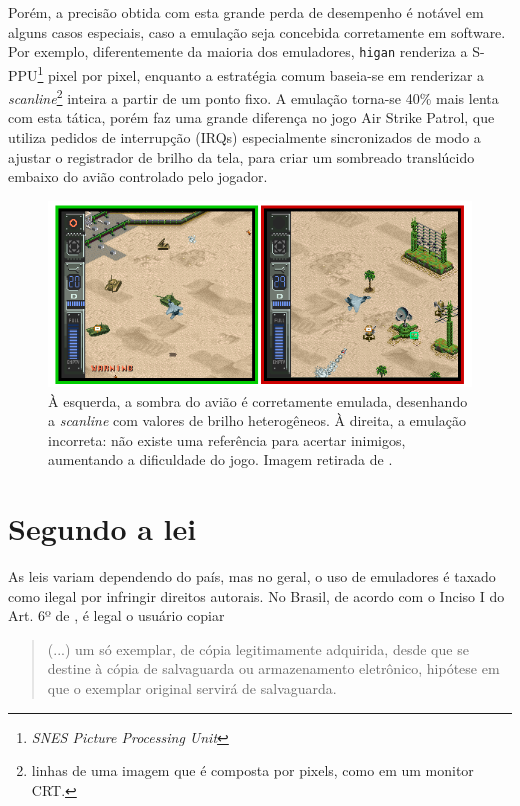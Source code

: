 \documentclass[12pt]{article}
\begin{document}
Porém, a precisão obtida com esta grande perda de desempenho é notável em alguns
casos especiais, caso a emulação seja concebida corretamente em software. Por
exemplo, diferentemente da maioria dos emuladores, \texttt{higan} renderiza a
S-PPU\footnote{\emph{SNES Picture Processing Unit}} pixel por pixel, enquanto a
estratégia comum baseia-se em renderizar a \emph{scanline}\footnote{linhas de
uma imagem que é composta por pixels, como em um monitor CRT.} inteira a partir
de um ponto fixo. A emulação torna-se 40\% mais lenta \cite{emustate} com esta
tática, porém faz uma grande diferença no jogo Air Strike Patrol, que utiliza
pedidos de interrupção (IRQs) especialmente sincronizados de modo a ajustar o
registrador de brilho da tela, para criar um sombreado translúcido embaixo do
avião controlado pelo jogador.

\begin{figure}[ht]
\centering
\includegraphics[scale=0.70]{images/airforce}
\caption{À esquerda, a sombra do avião é corretamente emulada, desenhando a
\emph{scanline} com valores de brilho heterogêneos. À direita, a emulação
incorreta: não existe uma referência para acertar inimigos, aumentando a
dificuldade do jogo. Imagem retirada de \cite{accpower}.}
\end{figure}

\section{Segundo a lei}

As leis variam dependendo do país, mas no geral, o uso de emuladores é taxado
como ilegal por infringir direitos autorais.  No Brasil, de acordo com o Inciso
I do Art. 6º de \cite{lei9609}, é legal o usuário copiar

\begin{quote}
(...) um só exemplar, de cópia legitimamente adquirida, desde que se destine à
cópia de salvaguarda ou armazenamento eletrônico, hipótese em que o exemplar
original servirá de salvaguarda.
\end{quote}
\end{document}
